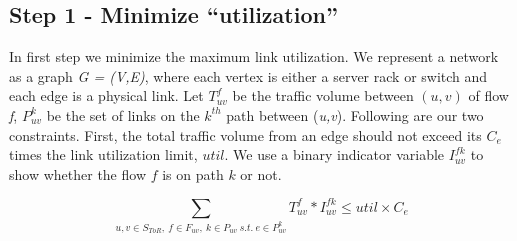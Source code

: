 \iffalse
\begin{itemize}
\item $S$ - Set of all switches
\item $S_{ToR}$ - Set of all ToR switches
\item $\tau_{u}, \forall u \in S$ - Maximum number of flow entries in the switch $u$
\item $E$ - Set of all physical links (between two adjacent devices)
\item $C_e, \forall e \in E$ - capacity of individual links
\item $F_{uv}$ - set of all flows from $u$ to $v$ where $u,v \in S_{ToR}$
\item $P_{uv}$ - Set of paths from device $u$ to device $v$
\item $K _{uv}$ - Number of paths from device $u$ to $v$ where $u,v \in S_{ToR}$ 
\item $P^k _{uv}$ - Set of links of $k^{th}$ path from device $u$ to $v$ where $u,v \in S_{ToR}$
\item $T ^f _{uv}$ - Traffic volume from $u$ to $v$ of flow $f$ where $u,v \in S_{ToR}$
\item $util$ - maximum link utilization
\item $I ^{fk} _{uv}$ - Indicator variable denoting that flow $f$ from $u$ to $v$  takes the $k^{th}$ path.
\end{itemize}
\fi

\subsection{Step 1 - Minimize ``utilization''}
	In first step we minimize the maximum link utilization. We represent a network as a graph \textit{G = (V,E)}, where each vertex is either a server rack or switch and each edge is a physical link. Let $T ^f _{uv}$ be the traffic volume between $(u,v)$ of flow \textit{f}, $P^k _{uv}$ be the set of links on the $k^{th}$ path between (\textit{u,v}). Following are our two constraints. First, the total traffic volume from an edge should not exceed its $C_e$ times the link utilization limit, $util$. We use a binary indicator variable  $I ^{fk} _{uv}$ to show whether the flow $f$ is on path $k$ or not.

	
\begin{equation}
    \sum _{u,v \in S_{ToR},~f \in F_{uv},~k  \in P_{uv}~s.t.~e \in P^k _{uv}} T ^f _{uv} *  I^{fk}_{uv} \leq util \times C_e 
\end{equation}
	
